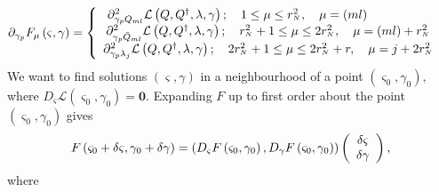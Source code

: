 \documentclass[aps,preprint]{revtex4}%
\begin{document}
\begin{align}
\partial_{\gamma_{p}}F_{\mu}\left(  \varsigma,\gamma\right)   &  =\left\{
\begin{array}
[c]{c}%
\partial_{\gamma_{p}Q_{ml}}^{2}\mathcal{L}\left(  Q,Q^{\dagger},\lambda
,\gamma\right)  ;\quad1\leq\mu\leq r_{^{N}}^{2},\quad\mu=\left(  ml\right)
\qquad\qquad\quad\\
\partial_{\gamma_{p}\bar{Q}_{ml}}^{2}\mathcal{L}\left(  Q,Q^{\dagger}%
,\lambda,\gamma\right)  ;\quad r_{^{N}}^{2}+1\leq\mu\leq2r_{^{N}}^{2},\quad
\mu=\left(  ml\right)  +r_{^{N}}^{2}\\
\partial_{\gamma_{p}\lambda_{j}}^{2}\mathcal{L}\left(  Q,Q^{\dagger}%
,\lambda,\gamma\right)  ;\quad2r_{^{N}}^{2}+1\leq\mu\leq2r_{^{N}}^{2}%
+r,\quad\mu=j+2r_{^{N}}^{2}%
\end{array}
\right.
\end{align}
We want to find solutions $\left(  \varsigma,\gamma\right)  $ in a
neighbourhood of a point $\left(  \varsigma_{0},\gamma_{0}\right)  ,$ where
$D_{\varsigma}\mathcal{L}\left(  \varsigma_{0},\gamma_{0}\right)
=\mathbf{0}.$ Expanding $F$ up to first order about the point $\left(
\varsigma_{0},\gamma_{0}\right)  $ gives
\begin{equation}
F\left(  \varsigma_{0}+\delta\varsigma,\gamma_{0}+\delta\gamma\right)
=\left(  D_{\varsigma}F\left(  \varsigma_{0},\gamma_{0}\right)  ,D_{\gamma
}F\left(  \varsigma_{0},\gamma_{0}\right)  \right)  \left(
\begin{array}
[c]{c}%
\delta\varsigma\\
\delta\gamma
\end{array}
\right)  ,
\end{equation}
where
\end{document}
